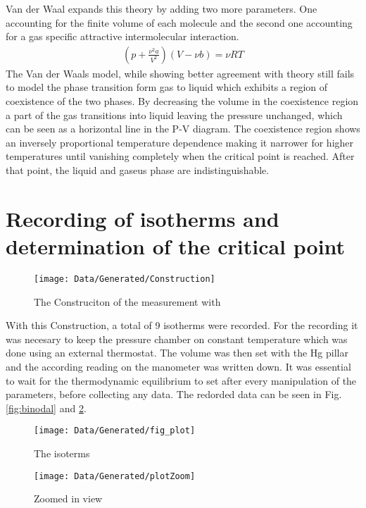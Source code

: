 \documentclass[a4paper,10pt,twocolumn]{article}
\begin{document}
    Van der Waal expands this theory by adding two more parameters.
    One accounting for the finite volume of each molecule and the second one accounting for a gas specific attractive intermolecular interaction.
    \begin{align}
    (p+\frac{\nu^2 a}{V^2})(V-\nu b) = \nu RT
    \end{align}
    The Van der Waals model, while showing better agreement with theory still fails to model the phase transition form gas to liquid which exhibits a region of coexistence of the two phases. 
    By decreasing the volume in the coexistence region a part of the gas transitions into liquid leaving the pressure unchanged, which can be seen as a horizontal line in the P-V diagram.
    The coexistence region shows an inversely proportional temperature dependence making it narrower for higher temperatures until vanishing completely when the critical point is reached.
    After that point, the liquid and gaseus phase are indistinguishable.
    \section{Recording of isotherms and determination of the critical point}\label{sec:Measurement}
    \begin{figure}
        \label{fig:construction}
        \begin{center}
        \texttt{[image: Data/Generated/Construction]}
        \caption[]{The Construciton of the measurement with}
        \end{center}
    \end{figure}
    With this Construction, a total of 9 isotherms were recorded. 
    For the recording it was necesary to keep the pressure chamber on constant temperature which was done using an external thermostat.
    The volume was then set with the Hg pillar and the according reading on the manometer was written down.
    It was essential to wait for the thermodynamic equilibrium to set after every manipulation of the parameters, before collecting any data.
    The redorded data can be seen in Fig. \ref{fig:binodal} and \ref{fig:binodalZoom}.
    \begin{figure}
        \begin{center}
            \texttt{[image: Data/Generated/fig\_plot]}\label{fig:binodal}
            \caption[]{The isoterms}
            \texttt{[image: Data/Generated/plotZoom]}\label{fig:binodalZoom}
            \caption[]{Zoomed in view}
        \end{center}
    \end{figure}
    
\end{document}
